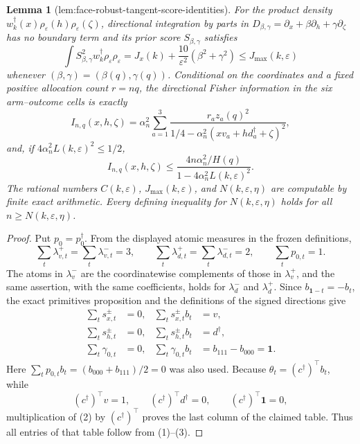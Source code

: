 \documentclass{article}
\newtheorem{lemma}{Lemma}
\begin{document}
{\begin{lemma}[lem:face-robust-tangent-score-identities]
For the product density
\(w_k^\dagger(x)\rho_\varepsilon(h)\rho_\varepsilon(\zeta)\), directional integration by parts in
\(D_{\beta,\gamma}=\partial_x+\beta\partial_h+\gamma\partial_\zeta\) has no boundary term and its prior score \(S_{\beta,\gamma}\) satisfies
\[
\int S_{\beta,\gamma}^2
w_k^\dagger\rho_\varepsilon\rho_\varepsilon
=J_x(k)+\frac{10}{\varepsilon^2}(\beta^2+\gamma^2)
\le J_{\max}(k,\varepsilon)
\]
whenever \((\beta,\gamma)=(\beta(q),\gamma(q))\).  Conditional on the coordinates and a fixed positive allocation count \(r=nq\), the directional Fisher information in the six arm--outcome cells is exactly
\[
I_{n,q}(x,h,\zeta)
=\alpha_n^2\sum_{a=1}^3
\frac{r_az_a(q)^2}
{1/4-\alpha_n^2(xv_a+hd_a^\dagger+\zeta)^2},
\]
and, if \(4\alpha_n^2L(k,\varepsilon)^2\le1/2\),
\[
I_{n,q}(x,h,\zeta)
\le\frac{4n\alpha_n^2/H(q)}
{1-4\alpha_n^2L(k,\varepsilon)^2}.
\]
The rational numbers \(C(k,\varepsilon)\), \(J_{\max}(k,\varepsilon)\), and
\(N(k,\varepsilon,\eta)\) are computable by finite exact arithmetic.  Every defining inequality for \(N(k,\varepsilon,\eta)\) holds for all \(n\ge N(k,\varepsilon,\eta)\).
\end{lemma}
\begin{proof}
Put \(p_0=p_0^\dagger\).  From the displayed atomic measures in the frozen definitions,
\[
 \sum_t\lambda_{v,t}^+=\sum_t\lambda_{v,t}^-=3,
 \qquad
 \sum_t\lambda_{d,t}^+=\sum_t\lambda_{d,t}^-=2,
 \qquad
 \sum_t p_{0,t}=1.
\tag{1}
\]
The atoms in \(\lambda_v^-\) are the coordinatewise complements of those in
\(\lambda_v^+\), and the same assertion, with the same coefficients, holds for
\(\lambda_d^-\) and \(\lambda_d^+\).  Since \(b_{\mathbf1-t}=-b_t\), the exact
primitives proposition and the definitions of the signed directions give
\[
\begin{aligned}
 \sum_t s_{x,t}^\pm&=0,&
 \sum_t s_{x,t}^\pm b_t&=v,\\
 \sum_t s_{h,t}^\pm&=0,&
 \sum_t s_{h,t}^\pm b_t&=d^\dagger,\\
 \sum_t\gamma_{0,t}&=0,&
 \sum_t\gamma_{0,t}b_t&=b_{111}-b_{000}=\mathbf1.
\end{aligned}
\tag{2}
\]
Here \(\sum_t p_{0,t}b_t=(b_{000}+b_{111})/2=0\) was also used.  Because
\(\theta_t=(c^\dagger)^\top b_t\), while
\[
 (c^\dagger)^\top v=1,
 \qquad (c^\dagger)^\top d^\dagger=0,
 \qquad (c^\dagger)^\top\mathbf1=0,
\tag{3}
\]
multiplication of (2) by \((c^\dagger)^\top\) proves the last column of the
claimed table.  Thus all entries of that table follow from (1)--(3).


\end{proof}}
\end{document}
